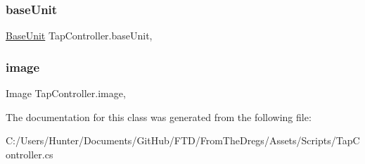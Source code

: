 \subsubsection{\texorpdfstring{baseUnit}{baseUnit}}
{\footnotesize\ttfamily \mbox{\hyperlink{class_base_unit}{Base\+Unit}} Tap\+Controller.\+base\+Unit\hspace{0.3cm}{\ttfamily [get]}, {\ttfamily [set]}}

\mbox{\label{class_tap_controller_a0da9433117902759e995719f5ef952aa}} 
\subsubsection{\texorpdfstring{image}{image}}
{\footnotesize\ttfamily Image Tap\+Controller.\+image\hspace{0.3cm}{\ttfamily [get]}, {\ttfamily [set]}}



The documentation for this class was generated from the following file\+:\begin{DoxyCompactItemize}
\item 
C\+:/\+Users/\+Hunter/\+Documents/\+Git\+Hub/\+F\+T\+D/\+From\+The\+Dregs/\+Assets/\+Scripts/Tap\+Controller.\+cs\end{DoxyCompactItemize}
